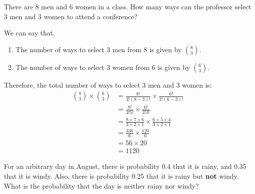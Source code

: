 \documentclass[a4paper, 10pt]{article}
\begin{document}
\begin{problem}
There are 8 men and 6 women in a class.
How many ways can the professor select 3 men and 3 women to attend a conference?
\end{problem}

\begin{solution}
	We can say that,
	\begin{enumerate}[wide=0pt, itemsep=2pt, parsep=0pt, leftmargin=*]
		\item The number of ways to select 3 men from 8 is given by \(\binom{8}{3}\).
		\item The number of ways to select 3 women from 6 is given by \(\binom{6}{3}\).
	\end{enumerate}

	Therefore, the total number of ways to select 3 men and 3 women is:
	\begin{align*}
		\binom{8}{3} \times \binom{6}{3} & = \frac{8!}{3!(8-3)!} \times \frac{6!}{3!(6-3)!}                                                         \\
		                                 & = \frac{8!}{3!5!} \times \frac{6!}{3!3!}                                                                 \\
		                                 & = \frac{8 \times 7 \times 6}{3 \times 2 \times 1} \times \frac{6 \times 5 \times 4}{3 \times 2 \times 1} \\
		                                 & = \frac{336}{6} \times \frac{120}{6}                                                                     \\
		                                 & = 56 \times 20                                                                                           \\
		                                 & = \boxed{1120}
	\end{align*}
\end{solution}

\begin{problem}
For an arbitrary day in August, there is probability 0.4 that it is rainy, and 0.35 that it is windy.
Also, there is probability 0.25 that it is rainy but \textbf{not} windy.
What is the probability that the day is neither rainy nor windy?
\end{problem}
\end{document}
